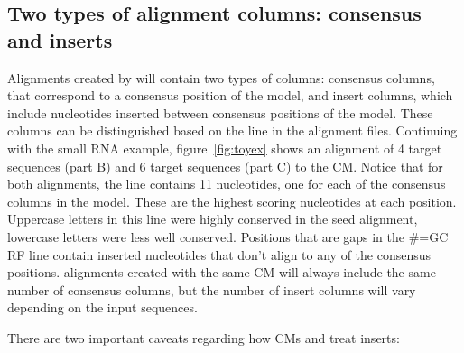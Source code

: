 \subsection{Two types of alignment columns: consensus and inserts}

Alignments created by  will contain two types of
columns: consensus columns, that correspond to a consensus position of
the model, and insert columns, which include nucleotides inserted
between consensus positions of the model. These columns can be
distinguished based on the  line in the alignment
files. Continuing with the small RNA example, figure~\ref{fig:toyex}
shows an alignment of 4 target sequences (part B) and 6 target
sequences (part C) to the CM. Notice that for both alignments, the
 line contains 11 nucleotides, one for each of the
consensus columns in the model. These are the highest scoring
nucleotides at each position. Uppercase letters in this line were
highly conserved in the seed alignment, lowercase letters were less
well conserved. Positions that are gaps in the {\#=GC RF} line
contain inserted nucleotides that don't align to any of the consensus
positions. 
 alignments created with the same CM will
always include the same number of consensus columns, but the number of
insert columns will vary depending on the input sequences.

There are two important caveats regarding how CMs and 
treat inserts:


